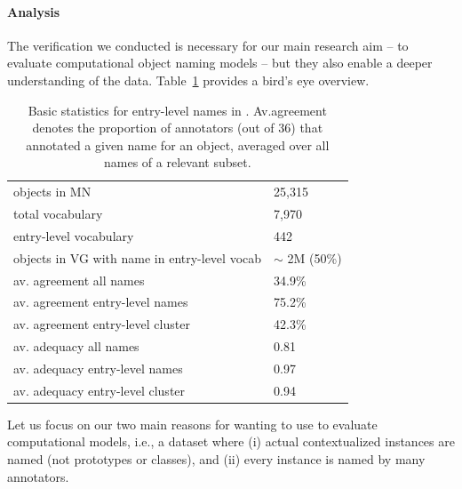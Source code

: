 

\paragraph{Analysis}
\label{sect:mn_analysis}

The verification we conducted is necessary for our main research aim -- to evaluate computational object naming models -- but they also enable a deeper understanding of the \mn data.
Table~\ref{tab:stat-entry-level} provides a bird's eye overview.
\begin{table}[t]
	\centering
	\small
	\begin{tabular}{p{5cm}l}
		\toprule		
		objects in MN & 25,315\\
		total vocabulary &  7,970\\
		entry-level vocabulary & 442\\
		objects in VG with name in entry-level vocab & $\sim$ 2M (50\%)\\
		\midrule
		av. agreement all names & 34.9\%\\
		av. agreement entry-level names & 75.2\%\\
		av. agreement entry-level cluster & 42.3\%\\
		\midrule
		av. adequacy all names & 0.81\\
		av. adequacy entry-level names & 0.97 \\
		av. adequacy entry-level cluster & 0.94 \\
		\bottomrule	
	\end{tabular}
	\caption{Basic statistics for entry-level names in \mn. Av.agreement denotes the proportion of annotators (out of 36) that annotated a given name for an object, averaged over all names of a relevant subset.}
	\label{tab:stat-entry-level}
\end{table}
Let us focus on our two main reasons for wanting to use \mn to evaluate computational models, i.e., a dataset where (i) actual contextualized instances are named (not prototypes or classes), and (ii) every instance is named by many annotators.

